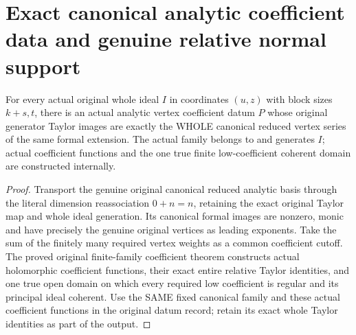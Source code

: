 \section{Exact canonical analytic coefficient data and genuine relative normal support}

\begin{theorem}
\label{hir:actual-canonical-reduced-analytic-coefficient-data}
\leanok
For every actual original whole ideal $I$ in coordinates $(u,z)$ with
block sizes $k+s,t$, there is an actual analytic vertex coefficient datum
$P$ whose original generator Taylor images are exactly the WHOLE canonical
reduced vertex series of the same formal extension. The actual family
belongs to and generates $I$; actual coefficient functions and the one
true finite low-coefficient coherent domain are constructed internally.
\end{theorem}
\begin{proof}
Transport the genuine original canonical reduced analytic basis through the
literal dimension reassociation $0+n=n$, retaining the exact original Taylor
map and whole ideal generation. Its canonical formal images are nonzero,
monic and have precisely the genuine original vertices as leading exponents.
Take the sum of the finitely many required vertex weights as a common
coefficient cutoff. The proved original finite-family coefficient theorem
constructs actual holomorphic coefficient functions, their exact entire
relative Taylor identities, and one true open domain on which every required
low coefficient is regular and its principal ideal coherent. Use the SAME
fixed canonical family and these actual coefficient functions in the original
datum record; retain its exact whole Taylor identities as part of the output.
\end{proof}

